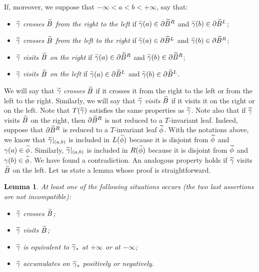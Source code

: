 \documentclass[10pt,a4paper]{article}
\newtheorem{lemm}[prop]{Lemma}
\theoremstyle{definition}
\theoremstyle{plain}
\numberwithin{equation}{section}
\numberwithin{figure}{section}
\let\oldtilde\tilde
\renewcommand*{\tilde}[1]{\mathchoice{\widetilde{#1}}{\widetilde{#1}}{\oldtilde{#1}}{\oldtilde{#1}}}
\begin{document}
If, moreover, we suppose that $-\infty<a<b<+\infty$, say that:
\begin{itemize}
\item $\tilde\gamma$ \emph{crosses $\tilde B$ from the right to the left }if $\tilde\gamma(a)\in \partial\tilde B^R$ and $\tilde\gamma(b)\in \partial\tilde B^L$;
\item $\tilde\gamma$ \emph{crosses $\tilde B$ from the left to the right} if $\tilde\gamma(a)\in \partial\tilde B^L$ and $\tilde\gamma(b)\in \partial\tilde B^R$;
\item $\tilde\gamma$ \emph{visits $\tilde B$ on the right} if $\tilde\gamma(a)\in \partial\tilde B^R$ and $\tilde\gamma(b)\in \partial\tilde B^R$;
\item $\tilde\gamma$ \emph{visits $\tilde B$ on the left} if $\tilde\gamma(a)\in \partial\tilde B^L$ and $\tilde\gamma(b)\in \partial\tilde B^L$.
\end{itemize}
We will say that $\tilde\gamma$ \emph{crosses} $\tilde B$ if it crosses it from the right to the left or from the left to the right. Similarly, we will say that $\tilde\gamma$ \emph{visits} $\tilde B$ if it visits it on the right or on the left. Note that $T(\tilde\gamma)$ satisfies the same properties as $\tilde\gamma$. Note also that if $\tilde\gamma$ visits $\tilde B$ on the right, then $\partial \tilde B^R$ is not reduced to a $T$-invariant leaf. Indeed, suppose that $\partial \tilde B^R$ is reduced to a $T$-invariant leaf $\tilde\phi$. With the notations above, we know that $\tilde\gamma\vert_{(a,b)}$ is included in $L(\tilde \phi)$ because it is disjoint from $\tilde \phi$ and $\gamma(a)\in \tilde\phi$. Similarly, $\tilde\gamma\vert_{(a,b)}$ is included in $R(\tilde \phi)$ because it is disjoint from $\tilde \phi$ and $\gamma(b)\in \tilde\phi$. We have found a contradiction. An analogous property holds if $\tilde\gamma$ visits $\tilde B$ on the left. Let us state a lemma whose proof is straightforward.

\begin{lemm}\label{Lem4Possib}
At least one of the following situations occurs (the two last assertions are not incompatible):
\begin{itemize}
\item $\tilde\gamma$ crosses $\tilde B$;
\item $\tilde\gamma$ visits $\tilde B$;
\item $\tilde\gamma$ is equivalent to $\tilde \gamma_*$ at $+\infty$ or at $-\infty$;
\item $\tilde\gamma$ accumulates on $\tilde\gamma_*$ positively or negatively.
\end{itemize}
\end{lemm}
\end{document}
